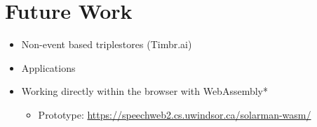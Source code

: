 \documentclass[logoontitle,tabu,supertabular,aspectratio=43]{preney-uwindsor-beamer}
\begin{document}


%

	\section{Future Work}
	\begin{frame}{\insertsection}
		\begin{itemize}
			\item Non-event based triplestores (Timbr.ai)
            \item Applications
            \item Working directly within the browser with WebAssembly*
            \begin{itemize}
                \item Prototype: \url{https://speechweb2.cs.uwindsor.ca/solarman-wasm/}
            \end{itemize}
		\end{itemize}
	\end{frame}
\end{document}
